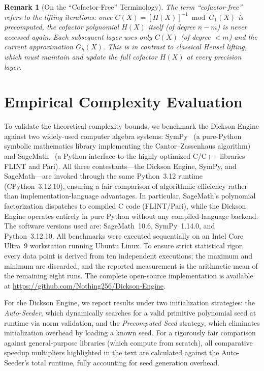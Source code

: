 \documentclass[12pt]{article}
\theoremstyle{plain}
\newtheorem{rem}{Remark}
\begin{document}
\begin{rem}[On the ``Cofactor-Free'' Terminology]
The term ``cofactor-free'' refers to the \emph{lifting iterations}: once $C(X) = [H(X)]^{-1} \bmod G_1(X)$ is precomputed, the cofactor polynomial $H(X)$ itself (of degree $n - m$) is never accessed again. Each subsequent layer uses only $C(X)$ (of degree $< m$) and the current approximation $G_h(X)$. This is in contrast to classical Hensel lifting, which must maintain and update the full cofactor $H(X)$ at every precision layer.
\end{rem}


\section{Empirical Complexity Evaluation}

To validate the theoretical complexity bounds, we benchmark the Dickson Engine against two widely-used computer algebra systems: SymPy~\cite{sympy} (a pure-Python symbolic mathematics library implementing the Cantor--Zassenhaus algorithm) and SageMath~\cite{sagemath} (a Python interface to the highly optimized C/C++ libraries FLINT and Pari). All three contestants---the Dickson Engine, SymPy, and SageMath---are invoked through the same Python~3.12 runtime (CPython~3.12.10), ensuring a fair comparison of algorithmic efficiency rather than implementation-language advantages. In particular, SageMath's polynomial factorization dispatches to compiled C code (FLINT/Pari), while the Dickson Engine operates entirely in pure Python without any compiled-language backend. The software versions used are: SageMath~10.6, SymPy~1.14.0, and Python~3.12.10. All benchmarks were executed sequentially on an Intel Core Ultra~9 workstation running Ubuntu Linux. To ensure strict statistical rigor, every data point is derived from ten independent executions; the maximum and minimum are discarded, and the reported measurement is the arithmetic mean of the remaining eight runs. The complete open-source implementation is available at \url{https://github.com/Nothing256/Dickson-Engine}.

For the Dickson Engine, we report results under two initialization strategies: the \emph{Auto-Seeder}, which dynamically searches for a valid primitive polynomial seed at runtime via norm validation, and the \emph{Precomputed Seed} strategy, which eliminates initialization overhead by loading a known seed. For a rigorously fair comparison against general-purpose libraries (which compute from scratch), all comparative speedup multipliers highlighted in the text are calculated against the Auto-Seeder's total runtime, fully accounting for seed generation overhead.
\end{document}
